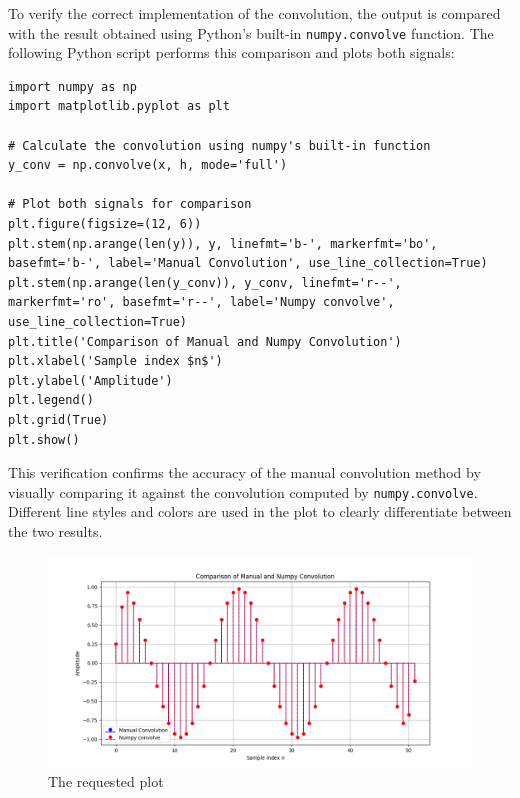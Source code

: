 
\item[(d)]
To verify the correct implementation of the convolution, the output is compared with the result obtained using Python's built-in \texttt{numpy.convolve} function. The following Python script performs this comparison and plots both signals:

\begin{verbatim}
import numpy as np
import matplotlib.pyplot as plt

# Calculate the convolution using numpy's built-in function
y_conv = np.convolve(x, h, mode='full')

# Plot both signals for comparison
plt.figure(figsize=(12, 6))
plt.stem(np.arange(len(y)), y, linefmt='b-', markerfmt='bo', basefmt='b-', label='Manual Convolution', use_line_collection=True)
plt.stem(np.arange(len(y_conv)), y_conv, linefmt='r--', markerfmt='ro', basefmt='r--', label='Numpy convolve', use_line_collection=True)
plt.title('Comparison of Manual and Numpy Convolution')
plt.xlabel('Sample index $n$')
plt.ylabel('Amplitude')
plt.legend()
plt.grid(True)
plt.show()
\end{verbatim}

This verification confirms the accuracy of the manual convolution method by visually comparing it against the convolution computed by \texttt{numpy.convolve}. Different line styles and colors are used in the plot to clearly differentiate between the two results.

\begin{figure}[h]
\centering
\includegraphics[width=\textwidth]{fig/ex3_plot_2}
\caption{The requested plot}
\label{fig:ex3_plot_2}
\end{figure}
